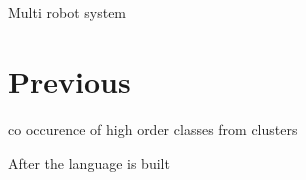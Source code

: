 \section{}
    \begin{frame}[allowframebreaks]{Multi robot system}
        \section{Previous}
            co occurence of high order classes from clusters
            
            After the language is built
    
    
    \end{frame}


\section{}
    
    